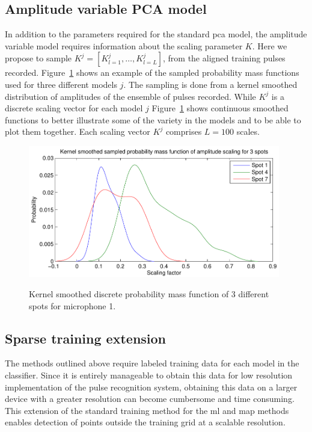\subsection{Amplitude variable PCA model}

In addition to the parameters required for the standard \gls{pca} model, the amplitude variable model requires information about the scaling parameter $K$. Here we propose to sample $K^j = [K^j_{l=1}, \ldots , K^j_{l=L}]$, from the aligned training pulses recorded. Figure~\ref{fig:amplitudeProbMass.pdf} shows an example of the sampled probability mass functions used for three different models $j$. The sampling is done from a kernel smoothed distribution of amplitudes of the ensemble of pulses recorded. While $K^j$ is a discrete scaling vector for each model $j$ Figure~\ref{fig:amplitudeProbMass.pdf} shows continuous smoothed functions to better illustrate some of the variety in the models and to be able to plot them together. Each scaling vector $K^j$ comprises $L=100$ scales.

\begin{figure}
\centering
  \includegraphics[width=110mm]{amplitudeProbMass.pdf}\\
  \caption{Kernel smoothed discrete probability mass function of 3 different spots for microphone 1.}\label{fig:amplitudeProbMass.pdf}
\end{figure}

\subsection{Sparse training extension}\label{sec:APRspareTraining}
The methods outlined above require labeled training data for each model in the classifier. Since it is entirely manageable to obtain this data for low resolution implementation of the pulse recognition system, obtaining this data on a larger device with a greater resolution can become cumbersome and time consuming. This extension of the standard training method for the \gls{ml} and \gls{map} methods enables detection of points outside the training grid at a scalable resolution.


